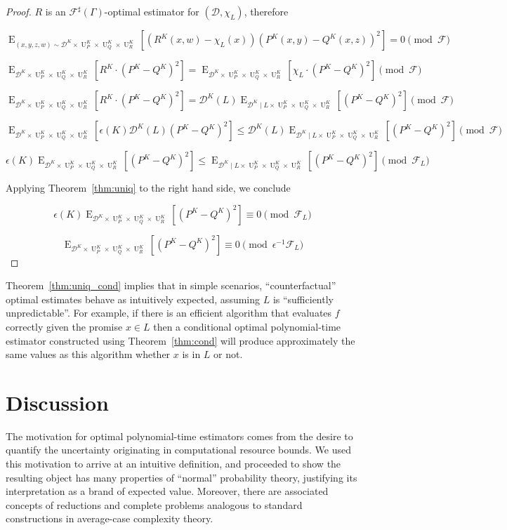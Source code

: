 \documentclass[11pt]{article}
\numberwithin{equation}{section}
\theoremstyle{definition}
\theoremstyle{plain}
\DeclareMathOperator{\E}{E}
\DeclareMathOperator{\Un}{U}
\newcommand{\Dist}{\mathcal{D}}
\newcommand{\Fall}{\mathcal{F}}
\newcommand{\ESG}{\Fall^\sharp(\Gamma)}
\begin{document}
\begin{proof}

${R}$ is an ${\ESG}$-optimal estimator for ${(\Dist, \chi_L)}$, therefore

\[\E_{(x,y,z,w) \sim \Dist^K \times \Un_P^K \times \Un_Q^K \times \Un_R^K}[(R^K(x,w)-\chi_L(x))(P^K(x,y)-Q^K(x,z))^2] = 0 \pmod \Fall\]

\[\E_{\Dist^K \times \Un_P^K \times \Un_Q^K \times \Un_R^K}[R^K \cdot (P^K-Q^K)^2] = \E_{\Dist^K \times \Un_P^K \times \Un_Q^K \times \Un_R^K}[\chi_L \cdot (P^K-Q^K)^2] \pmod \Fall\]

\[\E_{\Dist^K \times \Un_P^K \times \Un_Q^K \times \Un_R^K}[R^K \cdot (P^K-Q^K)^2] = \Dist^K(L) \E_{\Dist^K \mid L \times \Un_P^K \times \Un_Q^K \times \Un_R^K}[(P^K-Q^K)^2] \pmod \Fall\]

\[\E_{\Dist^K \times \Un_P^K \times \Un_Q^K \times \Un_R^K}[\epsilon(K)\Dist^K(L)(P^K-Q^K)^2] \leq \Dist^K(L) \E_{\Dist^K \mid L \times \Un_P^K \times \Un_Q^K \times \Un_R^K}[(P^K-Q^K)^2] \pmod \Fall\]

\[\epsilon(K)\E_{\Dist^K \times \Un_P^K \times \Un_Q^K \times \Un_R^K}[(P^K-Q^K)^2] \leq \E_{\Dist^K \mid L \times \Un_P^K \times \Un_Q^K \times \Un_R^K}[(P^K-Q^K)^2] \pmod {\Fall_L}\]

Applying Theorem~\ref{thm:uniq} to the right hand side, we conclude

\[\epsilon(K)\E_{\Dist^K \times \Un_P^K \times \Un_Q^K \times \Un_R^K}[(P^K-Q^K)^2] \equiv 0 \pmod {\Fall_L}\]

\[\E_{\Dist^K \times \Un_P^K \times \Un_Q^K \times \Un_R^K}[(P^K-Q^K)^2] \equiv 0 \pmod {\epsilon^{-1}\Fall_L}\]
%
\end{proof}

Theorem~\ref{thm:uniq_cond} implies that in simple scenarios, \enquote{counterfactual} optimal estimates behave as intuitively expected, assuming ${L}$ is \enquote{sufficiently unpredictable}. For example, if there is an efficient algorithm that evaluates ${f}$ correctly given the promise ${x \in L}$ then a conditional optimal polynomial-time estimator constructed using Theorem~\ref{thm:cond} will produce approximately the same values as this algorithm whether ${x}$ is in ${L}$ or not.

\section{Discussion}
\label{sec:discussion}

The motivation for optimal polynomial-time estimators comes from the desire to quantify the uncertainty originating in computational resource bounds. We used this motivation to arrive at an intuitive definition, and proceeded to show the resulting object has many properties of \enquote{normal} probability theory, justifying its interpretation as a brand of expected value. Moreover, there are associated concepts of reductions and complete problems analogous to standard constructions in average-case complexity theory. 
\end{document}
